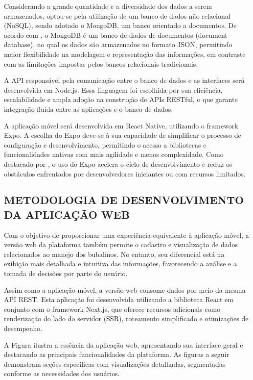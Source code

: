 Considerando a grande quantidade e a diversidade dos dados a serem armazenados, optou-se pela utilização de um banco de dados não relacional (NoSQL), sendo adotado o MongoDB, um banco orientado a documentos. De acordo com \cite{Fernando2020}, o MongoDB é um banco de dados de documentos (document database), no qual os dados são armazenados no formato JSON, permitindo maior flexibilidade na modelagem e representação das informações, em contraste com as limitações impostas pelos bancos relacionais tradicionais.

A API responsável pela comunicação entre o banco de dados e as interfaces será desenvolvida em Node.js. Essa linguagem foi escolhida por sua eficiência, escalabilidade e ampla adoção na construção de APIs RESTful, o que garante integração fluida entre as aplicações e o banco de dados.

A aplicação móvel será desenvolvida em React Native, utilizando o framework Expo. A escolha do Expo deve-se à sua capacidade de simplificar o processo de configuração e desenvolvimento, permitindo o acesso a bibliotecas e funcionalidades nativas com mais agilidade e menos complexidade. Como destacado por \cite{Bruna2021}, o uso do Expo acelera o ciclo de desenvolvimento e reduz os obstáculos enfrentados por desenvolvedores iniciantes ou com recursos limitados.

\subsection{METODOLOGIA DE DESENVOLVIMENTO DA APLICAÇÃO WEB}

Com o objetivo de proporcionar uma experiência equivalente à aplicação móvel, a versão web da plataforma também permite o cadastro e visualização de dados relacionados ao manejo dos bubalinos. No entanto, seu diferencial está na exibição mais detalhada e intuitiva das informações, favorecendo a análise e a tomada de decisões por parte do usuário.

Assim como a aplicação móvel, a versão web consome dados por meio da mesma API REST. Esta aplicação foi desenvolvida utilizando a biblioteca React em conjunto com o framework Next.js, que oferece recursos adicionais como renderização do lado do servidor (SSR), roteamento simplificado e otimizações de desempenho.

A Figura  ilustra a essência da aplicação web, apresentando sua interface geral e destacando as principais funcionalidades da plataforma. As figuras a seguir demonstram seções específicas com visualizações detalhadas, segmentadas conforme as necessidades dos usuários.

